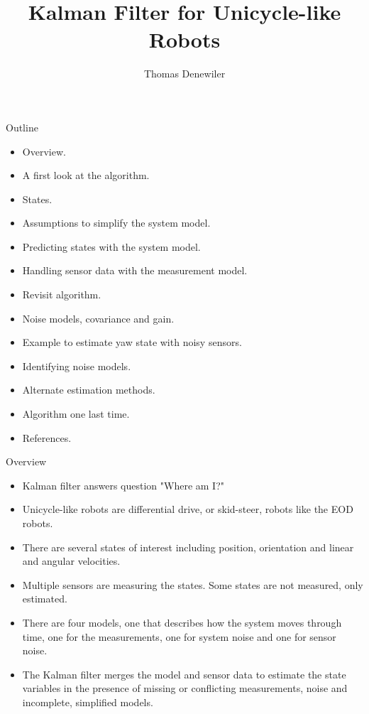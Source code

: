 \documentclass[hyperref={pdfpagelabels=false}]{beamer}
\title{Kalman Filter for Unicycle-like Robots}
\author{Thomas Denewiler}
\institute{SPAWAR}
\begin{document}
\def\argmin{\mathop{\arg\,\min}\limits}
\def\argmax{\mathop{\arg\,\max}\limits}

\begin{frame}
\titlepage
\end{frame}

\begin{frame}{Outline}
\begin{itemize}
\item Overview.
\item A first look at the algorithm.
\item States.
\item Assumptions to simplify the system model.
\item Predicting states with the system model.
\item Handling sensor data with the measurement model.
\item Revisit algorithm.
\item Noise models, covariance and gain.
\item Example to estimate yaw state with noisy sensors.
\item Identifying noise models.
\item Alternate estimation methods.
\item Algorithm one last time.
\item References.
\end{itemize}
\end{frame}

\begin{frame}{Overview}
\begin{itemize}
\item Kalman filter answers question "Where am I?"
\item Unicycle-like robots are differential drive, or skid-steer, robots like the EOD robots.
\item There are several states of interest including position, orientation and linear and angular velocities.
\item Multiple sensors are measuring the states. Some states are not measured, only estimated.
\item There are four models, one that describes how the system moves through time, one for the measurements, one for system noise and one for sensor noise.
\item The Kalman filter merges the model and sensor data to estimate the state variables in the presence of missing or conflicting measurements, noise and incomplete, simplified models.
\end{itemize}
\end{frame}
\end{document}
